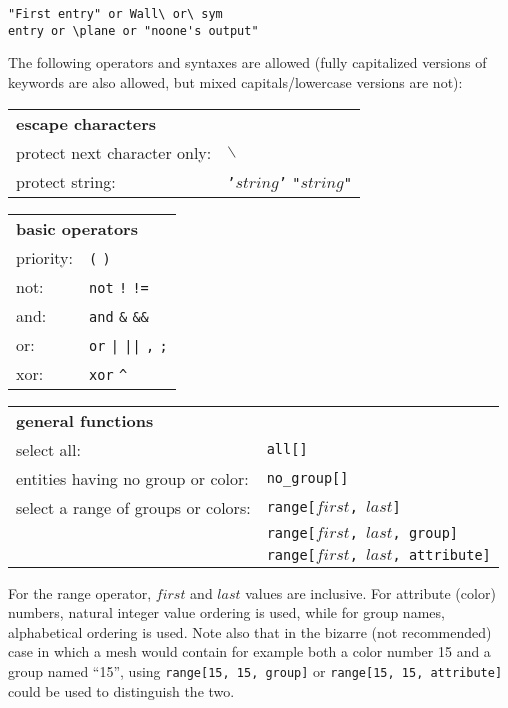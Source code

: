 {{{\verb+"First entry" or Wall\ or\ sym+\\
\verb+entry or \plane or "noone's output"+

The following operators and syntaxes are allowed (fully capitalized
versions of keywords are also allowed, but mixed capitals/lowercase
versions are not):

\begin{tabular}[top]{p{6cm} l}
\multicolumn{2}{l}{\bf escape characters }\\
protect next character only: & \texttt{$\backslash$} \\
protect string:              & \texttt{{'}$string${'}} \quad \texttt{"$string$"}\\
\end{tabular}

\begin{tabular}[top]{p{6cm} l}
\multicolumn{2}{l}{\bf basic operators }\\
priority: & \texttt{(} \quad \texttt{)} \\
not:      &  \texttt{not} \quad \texttt{!} \quad \texttt{!=} \\
and:      &  \texttt{and} \quad \texttt{\&} \quad \texttt{\&\&} \\
or:       &  \texttt{or} \quad \texttt{|} \quad \texttt{||} \quad \texttt{,} \quad \texttt{;} \\
xor:      &  \texttt{xor} \quad \texttt{\^} \\
\end{tabular}

\begin{tabular}[top]{p{6cm} l}
\multicolumn{2}{l}{\bf general functions }\\
select all:                        &  \texttt{all[]}\\
entities having no group or color: &  \texttt{no\_group[]} \\
select a range of groups or colors: &  \texttt{range[$first$, $last$]} \\
                                    &  \texttt{range[$first$, $last$, group]} \\
                                    &  \texttt{range[$first$, $last$, attribute]} \\
\end{tabular}

For the range operator, $first$ and $last$ values are inclusive.
For attribute (color) numbers, natural integer value ordering is used,
while for group names, alphabetical ordering is used. Note also that in
the bizarre (not recommended) case in which a mesh would contain for
example both a color number 15 and a group named ``15'', using
\texttt{range[15, 15, group]} or \texttt{range[15, 15, attribute]}
could be used to distinguish the two.

}}}
